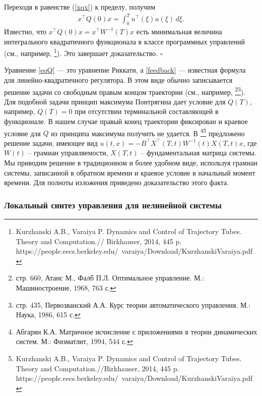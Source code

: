 \documentclass[../main.tex]{subfiles}
\begin{document}
Переходя в равенстве (\ref{xqx}) к пределу, получим
\begin{gather*}
x^{\top} Q(0)x = \int_{0}^{T} u^{\top}(\xi)  u(\xi) \, d\xi.
\end{gather*}
Известно, что $x^{\top} Q(0)x=x^{\top} W^{-1}(T)x$ есть минимальная величина интегрального квадратичного функционала в классе программных управлений (см., например, \footnote{Kurzhanski A.B., Varaiya P. Dynamics and Control of Trajectory Tubes. Theory and Computation.// Birkhauser, 2014, 445 p.\\ https://people.eecs.berkeley.edu/~varaiya/Download/KurzhanskiVaraiya.pdf}). Это завершает доказательство.  
\hfill $\square$
\begin{zam}
Уравнение \eqref{eqQ} --- это уравнение Риккати, а  \eqref{feedback} --- известная формула для линейно-квадратичного регулятора. В этом виде обычно записывается решение задачи  со свободным правым концом траектории (см., например, \footnote{стр. 660, Атанс М., Фалб П.Л. Оптимальное управление. М.: Машиностроение, 1968, 763 с.}\footnote{стр. 435, Первозванский А.А. Курс теории автоматического управления. М.: Наука, 1986, 615 с.}). Для подобной задачи  принцип максимума Понтрягина  дает  условие для $Q(T)$, например,  $Q(T)=0$ при отсутствии терминальной составляющей в функционале. В нашем случае правый конец траектории фиксирован и краевое условие для $Q$ из принципа максимума получить не удается. В  \footnote{Абгарян К.А. Матричное исчисление с приложениями в теории динамических систем. М.: Физматлит, 1994, 544 с.}\footnote{Kurzhanski A.B., Varaiya P. Dynamics and Control of Trajectory Tubes. Theory and Computation.//Birkhauser, 2014, 445 p.\\ https://people.eecs.berkeley.edu/~varaiya/Download/KurzhanskiVaraiya.pdf} предложено решение задачи, имеющее вид $u(t,x)=-B^{\top} X^{\top}(T,t)W^{-1}(t) X(T,t)x$, где $W(t)$ -- грамиан управляемости, $X(T,t)$ -- фундаментальная матрица системы. Мы приводим решение в традиционном и  более удобном виде,  используя  грамиан системы, записанной в обратном времени и краевое условие в начальный момент времени. Для полноты изложения приведено доказательство этого факта. 
\end{zam}
\subsubsection{Локальный синтез управления для нелинейной системы}
\end{document}
